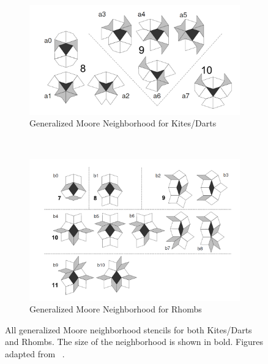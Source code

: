 \documentclass[a4paper,11pt]{report}
\begin{document}
\begin{figure}[htp]
\centering
\begin{subfigure}[t]{0.6\textwidth}
	\centering
	\includegraphics[width=\textwidth]{ch4_figs/ow08_fig18_kd_nbd}
	\caption{Generalized Moore Neighborhood for Kites/Darts}
\end{subfigure}
~
\begin{subfigure}[t]{0.6\textwidth}
	\centering
	\includegraphics[width=\textwidth]{ch4_figs/ow08_fig20_rh_nbd}
	\caption{Generalized Moore Neighborhood for Rhombs}
\end{subfigure}

\caption[Generalized Moore Neighborhoods for Kites/Darts and Rhombs]{
	All generalized Moore neighborhood stencils for both Kites/Darts and Rhombs. The size of the neighborhood is shown in bold. Figures adapted from 
	\citeauthor{ow08}~\cite{ow08}.
}
\label{fig:ow08_nbd_stencils}
\end{figure}
\end{document}
